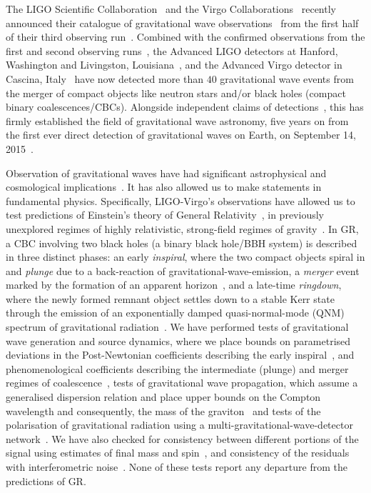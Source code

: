 \documentclass[twocolumn,prd,superscriptaddress,amsfonts,amssymb,amsmath,preprintnumbers]{revtex4-1}
\begin{document}
The LIGO Scientific Collaboration~\citep{lsc} and the Virgo Collaborations~\citep{Virgo} recently announced their catalogue of gravitational wave observations~\citep{GWTC-2} from the first half of their third observing run~\citep{O3reference}. Combined with the confirmed observations from the first and second observing runs~\citep{abbott2019gwtc}, the Advanced LIGO detectors at Hanford, Washington and Livingston, Louisiana~\citep{aasi2015characterization}, and the Advanced Virgo detector in Cascina, Italy~\citep{acernese2014advanced} have now detected more than $40$ gravitational wave events from the merger of compact objects like neutron stars and/or black holes (compact binary coalescences/CBCs). Alongside independent claims of detections~\citep{nitz20191,nitz20202,2019PhRvD.100b3007Z,2020PhRvD.101h3030V,Venumadhav_2020}, this has firmly established the field of gravitational wave astronomy, five years on from the first ever direct detection of gravitational waves on Earth, on September 14, 2015~\citep{abbott2016observation}. 
\par
Observation of gravitational waves have had significant astrophysical and cosmological implications~\citep{LSC_2016astroph,gw170817_mma,gw170817_joint,gw170817_hubble}. It has also allowed us to make statements in fundamental physics. Specifically, LIGO-Virgo's observations have allowed us to test predictions of Einstein's theory of General Relativity~\citep[GR]{}, in previously unexplored regimes of highly relativistic, strong-field regimes of gravity~\citep{LSC_2016grtests,GW170817_TGR,gwtc1_tgr}. In GR, a CBC involving two black holes (a binary black hole/BBH system) is described in three distinct phases: an early \textit{inspiral}, where the two compact objects spiral in and \textit{plunge} due to a back-reaction of gravitational-wave-emission, a \textit{merger} event marked by the formation of an apparent horizon~\citep{NRpaper}, and a late-time \textit{ringdown}, where the newly formed remnant object settles down to a stable Kerr state through the emission of an exponentially damped quasi-normal-mode (QNM) spectrum of gravitational radiation~\citep{vishu,earlyqnmpapers}.  We have performed tests of gravitational wave generation and source dynamics, where we place bounds on parametrised deviations in the Post-Newtonian coefficients describing the early inspiral~\citep{earlydevelopmentpapers}, and phenomenological coefficients describing the intermediate (plunge) and merger regimes of coalescence~\citep{TIGERmethodspapers}, tests of gravitational wave propagation, which assume a generalised dispersion relation and place upper bounds on the Compton wavelength and consequently, the mass of the graviton~\citep{gw170104,samajdar2017projected} and tests of the polarisation of gravitational radiation using a multi-gravitational-wave-detector network~\citep{gw170814,isi2017probing}. We have also checked for consistency between different portions of the signal using estimates of final mass and spin~\citep{Ghosh:2016xx,Ghosh:2017gfp,LSC_2016grtests}, and consistency of the residuals with interferometric noise~\citep{Ghonge:2020suv,gwtc1_tgr}. None of these tests report any departure from the predictions of GR.
\end{document}
